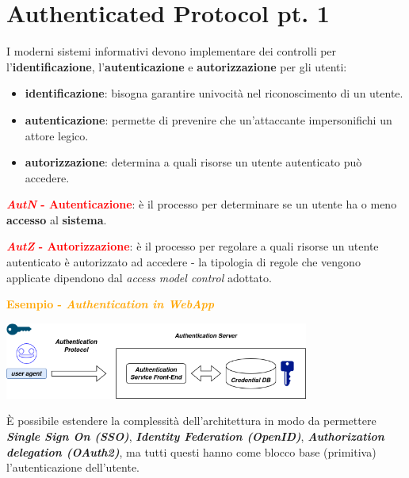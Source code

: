 \chapter{Authenticated Protocol pt. 1}

\begin{flushleft}
    I moderni sistemi informativi devono implementare dei controlli per l'\textbf{identificazione}, l'\textbf{autenticazione} e \textbf{autorizzazione} per gli utenti:
    \begin{itemize}[nosep]
        \item \textbf{identificazione}: bisogna garantire univocità nel riconoscimento di un utente.
        \item \textbf{autenticazione}: permette di prevenire che un'attaccante impersonifichi un attore legico.
        \item \textbf{autorizzazione}: determina a quali risorse un utente autenticato può accedere.
    \end{itemize}

    \textcolor{red}{\textbf{\textit{AutN} - Autenticazione}}: è il processo per determinare se un utente ha o meno \textbf{accesso} al \textbf{sistema}.
    
    \smallskip

    \textcolor{red}{\textbf{\textit{AutZ} - Autorizzazione}}: è il processo per regolare a quali risorse un utente autenticato è autorizzato ad accedere - la tipologia di regole che vengono applicate dipendono dal \textit{access model control} adottato.
\end{flushleft}

\begin{boxA}
    \textcolor{orange}{\textbf{Esempio - \textit{Authentication in WebApp}}}

    \begin{center}
        \includegraphics[width=0.75\textwidth]{img/web_app_auth.png}
    \end{center}

    È possibile estendere la complessità dell'architettura in modo da permettere \textbf{\textit{Single Sign On (SSO)}}, \textbf{\textit{Identity Federation (OpenID)}}, \textbf{\textit{Authorization delegation (OAuth2)}}, ma tutti questi hanno come blocco base (primitiva) l'autenticazione dell'utente.
\end{boxA}

